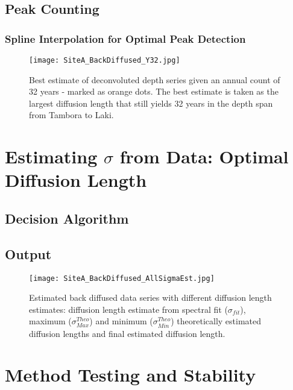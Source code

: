 \documentclass[../../CompleteThesis/Complete_1stDraft.tex]{subfiles}
\begin{document}
\subsection[Peak Counting]{Peak Counting}

\subsubsection[Interpolation]{Spline Interpolation for Optimal Peak Detection}

\begin{figure}
	\centering
	\texttt{[image: SiteA\_BackDiffused\_Y32.jpg]}
	\caption[Best estimate of deconvoluted depth series, Site A]{Best estimate of deconvoluted depth series given an annual count of 32 years - marked as orange dots. The best estimate is taken as the largest diffusion length that still yields 32 years in the depth span from Tambora to Laki.}
	\label{fig:SiteA_BackDiffused_Y32}
\end{figure}

\section[Optimal $\sigma$ Estimate]{Estimating $\sigma$ from Data: Optimal Diffusion Length}

\subsection[Decision algorithm]{Decision Algorithm}

\subsection[Output]{Output}

\begin{figure}
	\centering
	\texttt{[image: SiteA\_BackDiffused\_AllSigmaEst.jpg]}
	\caption[All diffusion length estimate deconvolutions, Site A]{Estimated back diffused data series with different diffusion length estimates: diffusion length estimate from spectral fit ($\sigma_{fit}$), maximum ($\sigma_{Max}^{Theo}$) and minimum ($\sigma_{Min}^{Theo}$) theoretically estimated diffusion lengths and final estimated diffusion length.}
	\label{fig:SiteA_BackDiffused_AllSigmaEst}
\end{figure}

\section[Stability Tests]{Method Testing and Stability}
\end{document}
